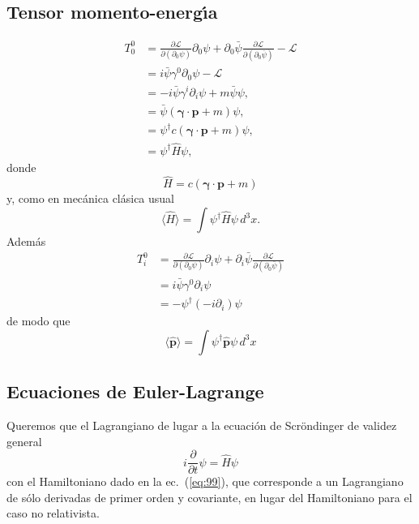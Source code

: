\subsection{Tensor momento-energ\'\i a}
\label{sec:tens-momento-energi}
\begin{align}
  T^0_0&=\frac{\partial\mathcal{L}}{\partial\left(\partial_0\psi\right)}\partial_0\psi+\partial_0\bar{\psi}\frac{\partial\mathcal{L}}{\partial\left(\partial_0\bar{\psi}\right)}-\mathcal{L}\nonumber\\
  &=i\bar{\psi}\gamma^0\partial_0\psi-\mathcal{L}\nonumber\\
  &=-i\bar{\psi}\gamma^i\partial_i\psi+m\bar{\psi} \psi,\nonumber\\
  &=\bar{\psi}(\boldsymbol{\gamma}\cdot\mathbf{p}+m)\psi,\nonumber\\
  &=\psi^\dagger c(\boldsymbol{\gamma}\cdot\mathbf{p}+m)\psi,\nonumber\\
  \label{eq:118}
  &=\psi^\dagger\hat{H} \psi,
\end{align}
donde
\begin{equation}
  \label{eq:101}
  \hat{H}= c(\boldsymbol{\gamma}\cdot\mathbf{p}+m)
\end{equation}
y, como en mec\'anica cl\'asica usual
\begin{equation}
  \label{eq:99}
  \langle\hat{H}\rangle=\int \psi^\dagger\hat{H} \psi\,d^3x.
\end{equation}
Adem\'as
\begin{align}
    T^0_i&=\frac{\partial\mathcal{L}}{\partial\left(\partial_0\psi\right)}\partial_i\psi+\partial_i\bar{\psi}\frac{\partial\mathcal{L}}{\partial\left(\partial_0\bar{\psi}\right)}\nonumber\\
    &=i\bar{\psi}\gamma^0 \partial_i\psi\nonumber\\
    &=-\psi^\dagger(-i\partial_i)\psi
\end{align}
de modo que
\begin{equation}
  \langle\hat{\mathbf{p}}\rangle=\int\psi^\dagger\hat{\mathbf{p}}\psi\,d^3 x
\end{equation}
\subsection{Ecuaciones de Euler-Lagrange}
\label{sec:ecuaciones-de-euler}
Queremos que el Lagrangiano de lugar a la ecuaci\'on de Scr\"ondinger de validez general
\begin{equation}
  \label{eq:102}
  i\frac{\partial}{\partial t}\psi=\hat{H} \psi
\end{equation}
con el Hamiltoniano dado en la ec.~(\ref{eq:99}), que corresponde a un Lagrangiano de s\'olo derivadas de primer orden y covariante, en lugar del Hamiltoniano para el caso no relativista. 


